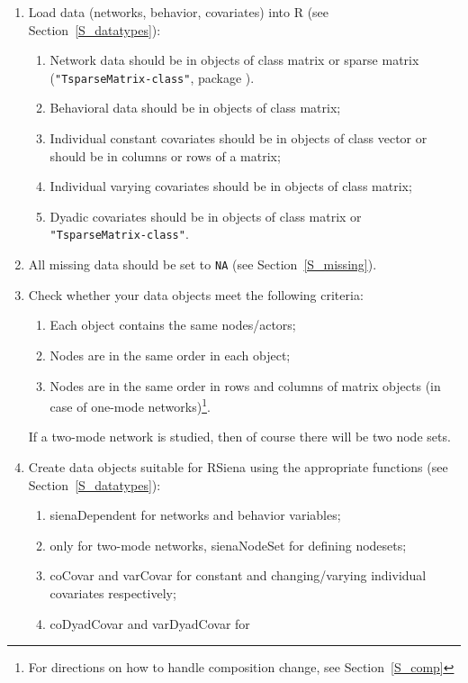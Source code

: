 \documentclass[a4paper,fleqn,11pt]{article}
\newcommand{\+}{\, + \,}
\newcommand{\sfn}[1]{\textsf{#1}}
\newcommand{\R}{{\sf R }}
\newcommand{\RS}{{\sf \textsf{RSiena} }}
\begin{document}
   \begin{enumerate}
	\item	Load data (networks, behavior, covariates) into \R
            (see Section~\ref{S_datatypes}):
	\begin{enumerate}
		\item Network data should be in objects of class matrix or
            sparse matrix\\ (\texttt{"TsparseMatrix-class"}, package ).
		\item	Behavioral data should be in objects of class matrix;
		\item	Individual constant covariates should be in objects of
            class vector or should be in columns or rows of a matrix;
		\item	Individual varying covariates should be in objects of class matrix;
		\item	Dyadic covariates should be in objects of class matrix
               or \texttt{"TsparseMatrix-class"}.
	\end{enumerate}
	\item	All missing data should be set to \texttt{NA} (see Section~\ref{S_missing}).
	\item Check whether your data objects meet the following criteria:
	\begin{enumerate}
		\item	Each object contains the same nodes/actors;
		\item	Nodes are in the same order in each object;
		\item	Nodes are in the same order in rows and columns of matrix
                objects (in case of one-mode networks)\footnote{For
		directions on how to handle composition change, see Section~\ref{S_comp}}.
	\end{enumerate}
   If a two-mode network is studied, then of course there will
   be two node sets.
	\item	Create data objects suitable for \RS using the appropriate
                functions (see Section~\ref{S_datatypes}):
	\begin{enumerate}
		\item	\sfn{sienaDependent} for networks and behavior variables;
		\item	only for two-mode networks, \sfn{sienaNodeSet} for defining nodesets;
		\item	\sfn{coCovar} and \sfn{varCovar} for constant and
                changing/varying individual covariates respectively;
		\item	\sfn{coDyadCovar} and \sfn{varDyadCovar} for

\end{enumerate}
\end{enumerate}
\end{document}
